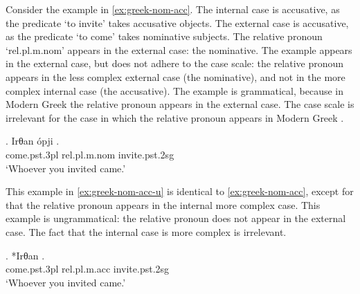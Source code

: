 Consider the example in \ref{ex:greek-nom-acc}.
The internal case is accusative, as the predicate  `to invite' takes accusative objects.
The external case is accusative, as the predicate  `to come' takes nominative subjects.
The relative pronoun  `\ac{rel}.\ac{pl}.\ac{m}.\ac{nom}' appears in the external case: the nominative.
The example appears in the external case, but does not adhere to the case scale: the relative pronoun appears in the less complex external  case (the nominative), and not in the more complex internal case (the accusative).
The example is grammatical, because in Modern Greek the relative pronoun appears in the external case. The case scale is irrelevant for the case in which the relative pronoun appears in Modern Greek .

\exg. Irθan ópji .\\
come.\ac{pst}.3\ac{pl} \ac{rel}.\ac{pl}.\ac{m}.\ac{nom} invite.\ac{pst}.2\ac{sg}\\
`Whoever you invited came.'\label{ex:greek-nom-acc}

This example in \ref{ex:greek-nom-acc-u} is identical to \ref{ex:greek-nom-acc}, except for that the relative pronoun appears in the internal  more complex case. This example is ungrammatical: the relative pronoun does not appear in the external case. The fact that the internal case is more complex is irrelevant.

\exg. *Irθan  .\\
come.\ac{pst}.3\ac{pl} \ac{rel}.\ac{pl}.\ac{m}.\ac{acc} invite.\ac{pst}.2\ac{sg}\\
`Whoever you invited came.'\label{ex:greek-nom-acc-u}

